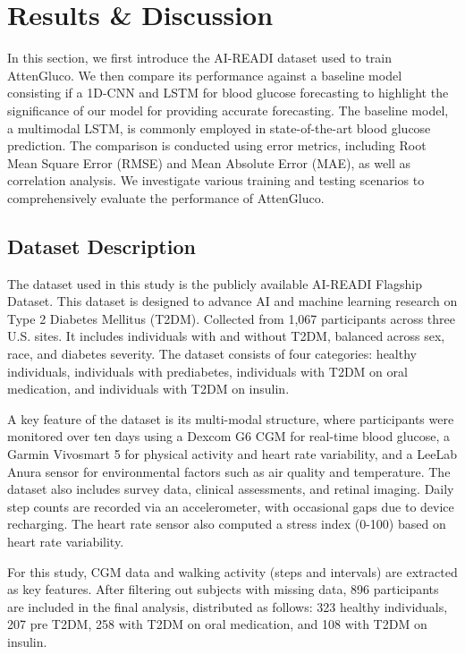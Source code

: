 
\section{Results \& Discussion}
In this section, we first introduce the AI-READI dataset used to train AttenGluco. We then compare its performance against a baseline model consisting if a 1D-CNN and LSTM for blood glucose forecasting to highlight the significance of our model for providing accurate forecasting. The baseline model, a multimodal LSTM, is commonly employed in state-of-the-art blood glucose prediction. The comparison is conducted using error metrics, including Root Mean Square Error (RMSE) and Mean Absolute Error (MAE), as well as correlation analysis. We investigate various training and testing scenarios to comprehensively evaluate the performance of AttenGluco.

\subsection{Dataset Description}
\label{section:dataset}
The dataset used in this study is the publicly available AI-READI Flagship Dataset. This dataset is designed to advance AI and machine learning research on Type 2 Diabetes Mellitus (T2DM). Collected from 1,067 participants across three U.S. sites. It includes individuals with and without T2DM, balanced across sex, race, and diabetes severity. The dataset consists of four categories: healthy individuals, individuals with prediabetes, individuals with T2DM on oral medication, and individuals with T2DM on insulin.

A key feature of the dataset is its multi-modal structure, where participants were monitored over ten days using a Dexcom G6 CGM for real-time blood glucose, a Garmin Vivosmart 5 for physical activity and heart rate variability, and a LeeLab Anura sensor for environmental factors such as air quality and temperature. The dataset also includes survey data, clinical assessments, and retinal imaging. Daily step counts are recorded via an accelerometer, with occasional gaps due to device recharging. The heart rate sensor also computed a stress index (0-100) based on heart rate variability.

For this study, CGM data and walking activity (steps and intervals) are extracted as key features. After filtering out subjects with missing data, 896 participants are included in the final analysis, distributed as follows: 323 healthy individuals, 207 pre T2DM, 258 with T2DM on oral medication, and 108 with T2DM on insulin.


